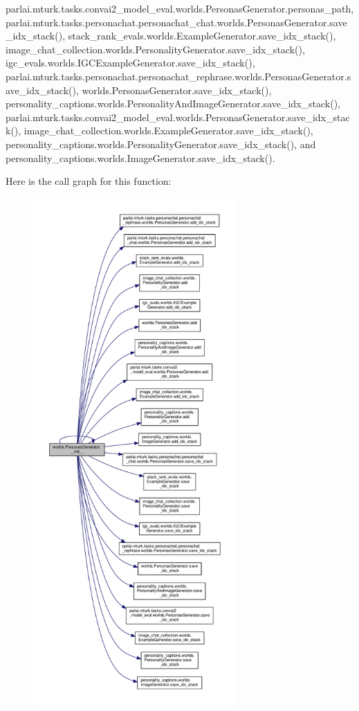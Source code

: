 parlai.\+mturk.\+tasks.\+convai2\+\_\+model\+\_\+eval.\+worlds.\+Personas\+Generator.\+personas\+\_\+path, parlai.\+mturk.\+tasks.\+personachat.\+personachat\+\_\+chat.\+worlds.\+Personas\+Generator.\+save\+\_\+idx\+\_\+stack(), stack\+\_\+rank\+\_\+evals.\+worlds.\+Example\+Generator.\+save\+\_\+idx\+\_\+stack(), image\+\_\+chat\+\_\+collection.\+worlds.\+Personality\+Generator.\+save\+\_\+idx\+\_\+stack(), igc\+\_\+evals.\+worlds.\+I\+G\+C\+Example\+Generator.\+save\+\_\+idx\+\_\+stack(), parlai.\+mturk.\+tasks.\+personachat.\+personachat\+\_\+rephrase.\+worlds.\+Personas\+Generator.\+save\+\_\+idx\+\_\+stack(), worlds.\+Personas\+Generator.\+save\+\_\+idx\+\_\+stack(), personality\+\_\+captions.\+worlds.\+Personality\+And\+Image\+Generator.\+save\+\_\+idx\+\_\+stack(), parlai.\+mturk.\+tasks.\+convai2\+\_\+model\+\_\+eval.\+worlds.\+Personas\+Generator.\+save\+\_\+idx\+\_\+stack(), image\+\_\+chat\+\_\+collection.\+worlds.\+Example\+Generator.\+save\+\_\+idx\+\_\+stack(), personality\+\_\+captions.\+worlds.\+Personality\+Generator.\+save\+\_\+idx\+\_\+stack(), and personality\+\_\+captions.\+worlds.\+Image\+Generator.\+save\+\_\+idx\+\_\+stack().

Here is the call graph for this function\+:
\nopagebreak
\begin{figure}[H]
\begin{center}
\leavevmode
\includegraphics[height=550pt]{classworlds_1_1PersonasGenerator_a8de0721e02fce900b4f3c15f6cf0e2e1_cgraph}
\end{center}
\end{figure}


